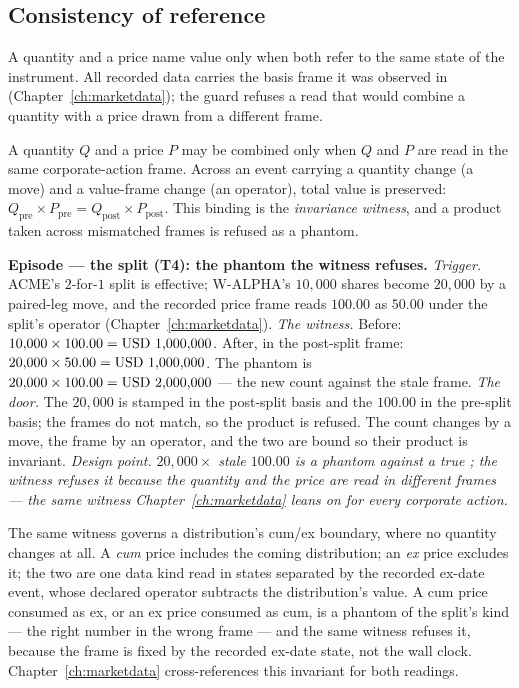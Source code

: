 \subsection{Consistency of reference}

A quantity and a price name value only when both refer to the same state of the
instrument. All recorded data carries the basis frame it was observed in
(Chapter~\ref{ch:marketdata}); the guard refuses a read that would combine a
quantity with a price drawn from a different frame.

\begin{invariant}\label{inv:consistency}
A quantity $Q$ and a price $P$ may be combined only when $Q$ and $P$ are read in
the same corporate-action frame. Across an event carrying a quantity change (a
move) and a value-frame change (an operator), total value is preserved:
$Q_{\text{pre}}\times P_{\text{pre}} = Q_{\text{post}}\times P_{\text{post}}$.
This binding is the \emph{invariance witness}, and a product taken across
mismatched frames is refused as a phantom.
\end{invariant}

\medskip\noindent\textbf{Episode --- the split (T4): the phantom the witness
refuses.}
\emph{Trigger.} ACME's $2$-for-$1$ split is effective; W-ALPHA's $10{,}000$
shares become $20{,}000$ by a paired-leg move, and the recorded price frame reads
$100.00$ as $50.00$ under the split's operator (Chapter~\ref{ch:marketdata}).
\emph{The witness.} Before: $10{,}000\times 100.00 = \mbox{USD~1{,}000{,}000}$. After,
in the post-split frame: $20{,}000\times 50.00 = \mbox{USD~1{,}000{,}000}$. The phantom
is $20{,}000\times 100.00 = \mbox{USD~2{,}000{,}000}$ --- the new count against the
stale frame. \emph{The door.} The $20{,}000$ is stamped in the post-split basis
and the $100.00$ in the pre-split basis; the frames do not match, so the product
is refused. The count changes by a move, the frame by an operator, and the two
are bound so their product is invariant.
\emph{Design point.} \emph{$20{,}000\times$ stale $100.00$ is a phantom
 against a true ; the witness refuses it
because the quantity and the price are read in different frames --- the same
witness Chapter~\ref{ch:marketdata} leans on for every corporate action.}

The same witness governs a distribution's cum/ex boundary, where no quantity
changes at all. A \emph{cum} price includes the coming distribution; an \emph{ex}
price excludes it; the two are one data kind read in states separated by the
recorded ex-date event, whose declared operator subtracts the distribution's
value. A cum price consumed as ex, or an ex price consumed as cum, is a phantom of
the split's kind --- the right number in the wrong frame --- and the same witness
refuses it, because the frame is fixed by the recorded ex-date state, not the wall
clock. Chapter~\ref{ch:marketdata} cross-references this invariant for both
readings.

